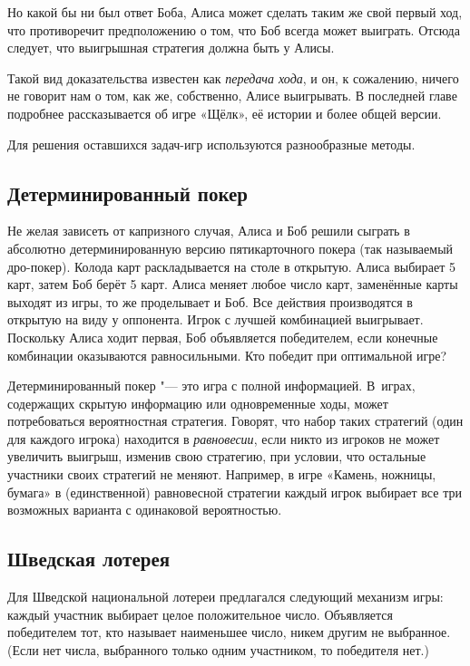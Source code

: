 \documentclass[twoside]{book}
\makeatletter
\newcommand{\rindex}[2][\imki@jobname]{%
  \index[#1]{\detokenize{#2}}%
}
\makeatother
\begin{document}
Но какой бы ни был ответ Боба, Алиса может сделать таким же свой первый ход, что противоречит предположению о том, что Боб всегда может выиграть.
Отсюда следует,
что выигрышная стратегия должна быть у Алисы.
\heart

Такой вид доказательства известен как \emph{передача хода}, и он, к сожалению, ничего не говорит нам о том, как же, собственно, Алисе выигрывать.
В последней главе подробнее рассказывается об игре «Щёлк», её истории и более общей версии.

\medskip

Для решения оставшихся задач-игр используются разнообразные методы.

\subsection*{Детерминированный покер}%
\rindex{Детерминированный покер}

Не желая зависеть от капризного случая, Алиса и Боб решили сыграть в абсолютно детерминированную версию пятикарточного покера (так называемый дро-покер).
Колода карт раскладывается на столе в открытую.
Алиса выбирает 5 карт, затем Боб берёт 5 карт.
Алиса меняет любое число карт, заменённые карты выходят из игры, то же проделывает и Боб.
Все действия производятся в открытую на виду у оппонента.
Игрок с лучшей комбинацией выигрывает.
Поскольку Алиса ходит первая, Боб объявляется победителем, если конечные комбинации оказываются равносильными.
Кто победит при оптимальной игре?

\medskip

Детерминированный покер "--- это игра с полной информацией.
В~играх, содержащих скрытую информацию или одновременные ходы, может потребоваться вероятностная стратегия.
Говорят, что набор таких стратегий (один для каждого игрока) находится в \emph{равновесии}, если никто из игроков не может увеличить выигрыш, изменив свою стратегию, при условии, что остальные участники своих стратегий не меняют.
Например, в игре «Камень, ножницы, бумага» в (единственной) равновесной стратегии каждый игрок выбирает все три возможных варианта с одинаковой вероятностью.

\subsection*{Шведская лотерея}%
\rindex{Шведская лотерея}

Для Шведской национальной лотереи предлагался следующий механизм игры: каждый участник выбирает целое положительное число.
Объявляется победителем тот, кто называет наименьшее число, никем другим не выбранное.
(Если нет числа, выбранного только одним участником, то победителя нет.)
\end{document}
